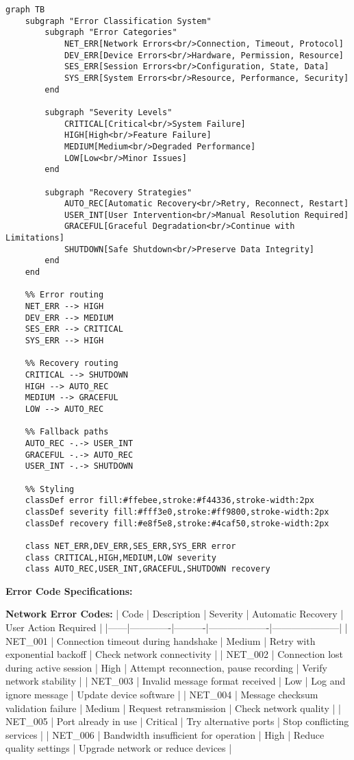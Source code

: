 \documentclass[12pt,a4paper]{article}
\begin{document}
\begin{verbatim}
graph TB
    subgraph "Error Classification System"
        subgraph "Error Categories"
            NET_ERR[Network Errors<br/>Connection, Timeout, Protocol]
            DEV_ERR[Device Errors<br/>Hardware, Permission, Resource]
            SES_ERR[Session Errors<br/>Configuration, State, Data]
            SYS_ERR[System Errors<br/>Resource, Performance, Security]
        end
        
        subgraph "Severity Levels"
            CRITICAL[Critical<br/>System Failure]
            HIGH[High<br/>Feature Failure]
            MEDIUM[Medium<br/>Degraded Performance]
            LOW[Low<br/>Minor Issues]
        end
        
        subgraph "Recovery Strategies"
            AUTO_REC[Automatic Recovery<br/>Retry, Reconnect, Restart]
            USER_INT[User Intervention<br/>Manual Resolution Required]
            GRACEFUL[Graceful Degradation<br/>Continue with Limitations]
            SHUTDOWN[Safe Shutdown<br/>Preserve Data Integrity]
        end
    end
    
    %% Error routing
    NET_ERR --> HIGH
    DEV_ERR --> MEDIUM
    SES_ERR --> CRITICAL
    SYS_ERR --> HIGH
    
    %% Recovery routing
    CRITICAL --> SHUTDOWN
    HIGH --> AUTO_REC
    MEDIUM --> GRACEFUL
    LOW --> AUTO_REC
    
    %% Fallback paths
    AUTO_REC -.-> USER_INT
    GRACEFUL -.-> AUTO_REC
    USER_INT -.-> SHUTDOWN
    
    %% Styling
    classDef error fill:#ffebee,stroke:#f44336,stroke-width:2px
    classDef severity fill:#fff3e0,stroke:#ff9800,stroke-width:2px
    classDef recovery fill:#e8f5e8,stroke:#4caf50,stroke-width:2px
    
    class NET_ERR,DEV_ERR,SES_ERR,SYS_ERR error
    class CRITICAL,HIGH,MEDIUM,LOW severity
    class AUTO_REC,USER_INT,GRACEFUL,SHUTDOWN recovery
\end{verbatim}

\textbf{Error Code Specifications:}

\textbf{Network Error Codes:}
| Code | Description | Severity | Automatic Recovery | User Action Required |
|------|-------------|----------|-------------------|---------------------|
| NET\_001 | Connection timeout during handshake | Medium | Retry with exponential backoff | Check network connectivity |
| NET\_002 | Connection lost during active session | High | Attempt reconnection, pause recording | Verify network
stability |
| NET\_003 | Invalid message format received | Low | Log and ignore message | Update device software |
| NET\_004 | Message checksum validation failure | Medium | Request retransmission | Check network quality |
| NET\_005 | Port already in use | Critical | Try alternative ports | Stop conflicting services |
| NET\_006 | Bandwidth insufficient for operation | High | Reduce quality settings | Upgrade network or reduce devices |
\end{document}
